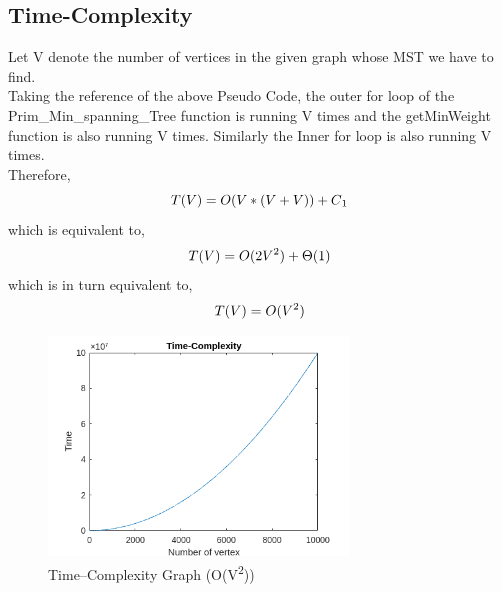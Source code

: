 \documentclass[conference]{IEEEtran}
\begin{document}
\subsection{Time-Complexity}
Let V denote the number of vertices in the given graph whose MST we have to find.\\
Taking  the reference of the above Pseudo Code, the outer for loop of the Prim\_Min\_spanning\_Tree function is running V times and the getMinWeight function is also running V times. Similarly the Inner for loop is also running V times.\\
Therefore,\\
\begin{equation}
    T(V) = O(V*(V+V)) + C\textsubscript{1}
\end{equation}
which is equivalent to,
\begin{equation}
    T(V) = O(2V\textsuperscript{2}) + \Theta(1)
\end{equation}
which is in turn equivalent to,
\begin{equation}
    T(V) = O(V\textsuperscript{2})
\end{equation}
\begin{figure}[htbp]
\centerline{\includegraphics[width=8cm]{Time.png}}
\caption{Time–Complexity Graph (O(V\textsuperscript{2}))}
\label{fig}
\end{figure}
\\
\end{document}
